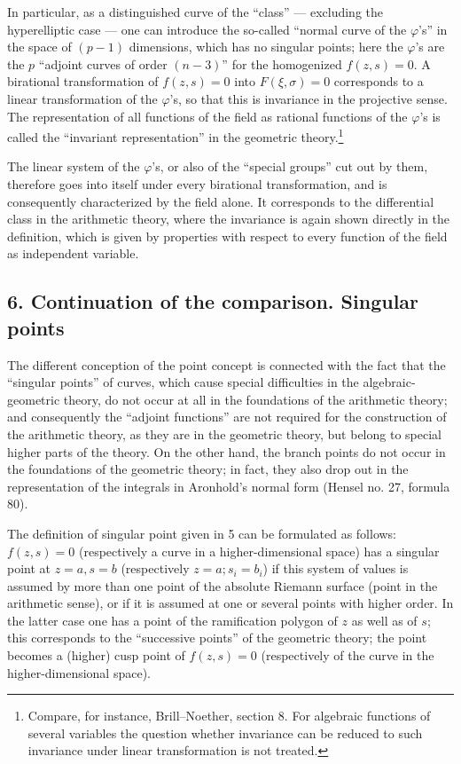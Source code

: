 \documentclass[11pt]{article}
\begin{document}
In particular, as a distinguished curve of the ``class'' --- excluding the hyperelliptic case --- one can introduce the so-called ``normal curve of the \(\varphi\)'s'' in the space of \((p-1)\) dimensions, which has no singular points; here the \(\varphi\)'s are the \(p\) ``adjoint curves of order \((n-3)\)'' for the homogenized \(f(z,s)=0\). A birational transformation of \(f(z,s)=0\) into \(F(\xi,\sigma)=0\) corresponds to a linear transformation of the \(\varphi\)'s, so that this is invariance in the projective sense. The representation of all functions of the field as rational functions of the \(\varphi\)'s is called the ``invariant representation'' in the geometric theory.\footnote{Compare, for instance, Brill--Noether, section 8. For algebraic functions of several variables the question whether invariance can be reduced to such invariance under linear transformation is not treated.}

The linear system of the \(\varphi\)'s, or also of the ``special groups'' cut out by them, therefore goes into itself under every birational transformation, and is consequently characterized by the field alone. It corresponds to the differential class in the arithmetic theory, where the invariance is again shown directly in the definition, which is given by properties with respect to every function of the field as independent variable.

\subsection*{6. Continuation of the comparison. Singular points}
The different conception of the point concept is connected with the fact that the ``singular points'' of curves, which cause special difficulties in the algebraic-geometric theory, do not occur at all in the foundations of the arithmetic theory; and consequently the ``adjoint functions'' are not required for the construction of the arithmetic theory, as they are in the geometric theory, but belong to special higher parts of the theory. On the other hand, the branch points do not occur in the foundations of the geometric theory; in fact, they also drop out in the representation of the integrals in Aronhold's normal form (Hensel no. 27, formula 80).

The definition of singular point given in 5 can be formulated as follows: \(f(z,s)=0\) (respectively a curve in a higher-dimensional space) has a singular point at \(z=a,s=b\) (respectively \(z=a; s_i=b_i\)) if this system of values is assumed by more than one point of the absolute Riemann surface (point in the arithmetic sense), or if it is assumed at one or several points with higher order. In the latter case one has a point of the ramification polygon of \(z\) as well as of \(s\); this corresponds to the ``successive points'' of the geometric theory; the point becomes a (higher) cusp point of \(f(z,s)=0\) (respectively of the curve in the higher-dimensional space).
\end{document}
